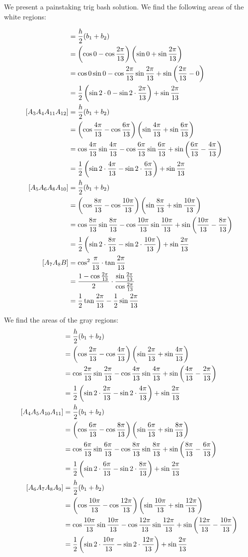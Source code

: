 \documentclass[10pt]{../usamts}
\begin{document}
\begin{solution}

\noindent We present a painstaking trig bash solution. We find the following areas of the white regions:

\newcommand{\showareacalc}[2]{
    &= \frac{h}{2}(b_1 + b_2) \\
    &= \paren{\cos{#1} - \cos{#2}}\paren{\sin{#1} + \sin{#2}} \\
    &= \cos{#1}\sin{#1} - \cos{#2} \sin{#2} + \sin{\paren{#2 - #1}} \\
    &= \frac{1}{2}\paren{\sin{2 \cdot #1} - \sin{2 \cdot #2}} + \sin{\frac{2\pi}{13}}
}
\newcommand{\showtrianglebarea}{
    \frac{1}{2} \tan{\frac{2\pi}{13}} - \frac{1}{2} \sin{\frac{2\pi}{13}}
}

\newcommand{\sinthirteen}[1]{
    \sin{{\frac{#1\pi}{13}}}
}
\newcommand{\costhirteen}[1]{
    \cos{{\frac{#1\pi}{13}}}
}
\newcommand{\tanthirteen}[1]{
    \tan{{\frac{#1\pi}{13}}}
}

\newcommand{\expthirteen}[1]{
    e^{\frac{#1\pi}{13}}
}

\begin{align*} 
[A_1A_2A_3] \showareacalc{0}{\frac{2\pi}{13}} \\
[A_3A_4A_{11}A_{12}] \showareacalc{\frac{4\pi}{13}}{\frac{6\pi}{13}} \\
[A_5A_6A_{8}A_{10}] \showareacalc{\frac{8\pi}{13}}{\frac{10\pi}{13}} \\
    [A_7A_8B] &= \cos^2{\frac{\pi}{13}} \cdot \tan{\frac{2\pi}{13}} \\
              &= \frac{1 - \cos{\frac{2\pi}{13}}}{2} \cdot \frac{\sin{\frac{2\pi}{13}}}{\cos{\frac{2\pi}{13}}}\\
              &= \showtrianglebarea
\end{align*}

We find the areas of the gray regions:
\begin{align*}
[A_2A_3A_{12}A_{13}] \showareacalc{\frac{2\pi}{13}}{\frac{4\pi}{13}} \\
[A_4A_5A_{10}A_{11}] \showareacalc{\frac{6\pi}{13}}{\frac{8\pi}{13}} \\
[A_6A_7A_{8}A_{9}] \showareacalc{\frac{10\pi}{13}}{\frac{12\pi}{13}} \\
\end{align*}


\end{solution}
\end{document}
